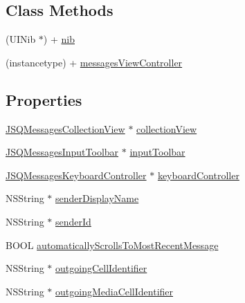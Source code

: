 \subsection*{Class Methods}
\begin{DoxyCompactItemize}
\item 
(U\+I\+Nib $\ast$) + \hyperlink{interface_j_s_q_messages_view_controller_a64504ea2b7ca5b674f6c350d6b76f936}{nib}
\item 
(instancetype) + \hyperlink{interface_j_s_q_messages_view_controller_a45d9236ec106e8bf890fc2cdd7f9ca40}{messages\+View\+Controller}
\end{DoxyCompactItemize}
\subsection*{Properties}
\begin{DoxyCompactItemize}
\item 
\hyperlink{interface_j_s_q_messages_collection_view}{J\+S\+Q\+Messages\+Collection\+View} $\ast$ \hyperlink{interface_j_s_q_messages_view_controller_a31c7589123a872e88cdbb530a953069a}{collection\+View}
\item 
\hyperlink{interface_j_s_q_messages_input_toolbar}{J\+S\+Q\+Messages\+Input\+Toolbar} $\ast$ \hyperlink{interface_j_s_q_messages_view_controller_adaa2bbc03bed38797ec29d98c3d0c0e0}{input\+Toolbar}
\item 
\hyperlink{interface_j_s_q_messages_keyboard_controller}{J\+S\+Q\+Messages\+Keyboard\+Controller} $\ast$ \hyperlink{interface_j_s_q_messages_view_controller_a5952f0a6cbe8edfc1858109732f3d11b}{keyboard\+Controller}
\item 
N\+S\+String $\ast$ \hyperlink{interface_j_s_q_messages_view_controller_ad034890061c8c276862b34e09252bae8}{sender\+Display\+Name}
\item 
N\+S\+String $\ast$ \hyperlink{interface_j_s_q_messages_view_controller_afd474f0e4f7923e29a98484090cbdc45}{sender\+Id}
\item 
B\+O\+O\+L \hyperlink{interface_j_s_q_messages_view_controller_a19a60a139ad222e77c6d2e266672c9bd}{automatically\+Scrolls\+To\+Most\+Recent\+Message}
\item 
N\+S\+String $\ast$ \hyperlink{interface_j_s_q_messages_view_controller_af805e4fee4497e23cde6032f2af76aa7}{outgoing\+Cell\+Identifier}
\item 
N\+S\+String $\ast$ \hyperlink{interface_j_s_q_messages_view_controller_a1cff2419947e6c239c78206477b5223a}{outgoing\+Media\+Cell\+Identifier}
\item 

\end{DoxyCompactItemize}
